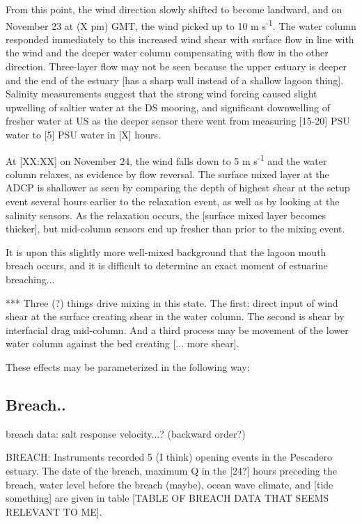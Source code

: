 From this point, the wind direction slowly shifted to become landward,
and on November 23 at (X pm) GMT, the wind picked up to 10 m
s\textsuperscript{-1}. The water column responded immediately to this
increased wind shear with surface flow in line with the wind and the
deeper water column compensating with flow in the other direction.
Three-layer flow may not be seen because the upper estuary is deeper and
the end of the estuary [has a sharp wall instead of a shallow lagoon
thing]. Salinity measurements suggest that the strong wind forcing
caused slight upwelling of saltier water at the DS mooring, and
significant downwelling of fresher water at US as the deeper sensor
there went from measuring [15-20] PSU water to [5] PSU water in [X]
hours.

At [XX:XX] on November 24, the wind falls down to 5 m
s\textsuperscript{-1} and the water column relaxes, as evidence by flow
reversal. The surface mixed layer at the ADCP is shallower as seen by
comparing the depth of highest shear at the setup event several hours
earlier to the relaxation event, as well as by looking at the salinity
sensors. As the relaxation occurs, the [surface mixed layer becomes
thicker], but mid-column sensors end up fresher than prior to the mixing
event.

It is upon this slightly more well-mixed background that the lagoon
mouth breach occurs, and it is difficult to determine an exact moment of
estuarine breaching...

*** Three (?) things drive mixing in this state. The first: direct input
of wind shear at the surface creating shear in the water column.  The
second is shear by interfacial drag mid-column. And a third process may
be movement of the lower water column against the bed creating [... more
shear].

These effects may be parameterized in the following way:



\subsection{Breach.. } \label{breach_dynamics}

breach data: salt response
velocity...? (backward order?)


BREACH: Instruments recorded 5 (I think) opening events in the Pescadero
estuary. The date of the breach, maximum Q in the [24?] hours preceding
the breach, water level before the breach (maybe), ocean wave climate,
and [tide something] are given in table [TABLE OF BREACH DATA THAT SEEMS
RELEVANT TO ME].

